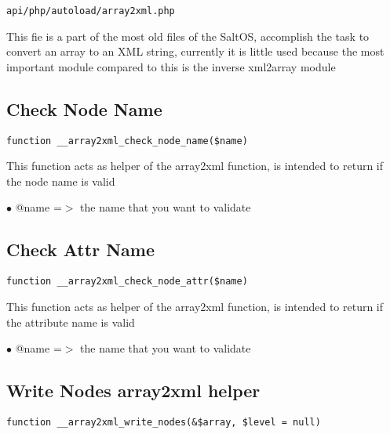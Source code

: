 \documentclass[a4paper]{book}
\begin{document}
\begin{lstlisting}
api/php/autoload/array2xml.php
\end{lstlisting}

This fie is a part of the most old files of the SaltOS, accomplish the task to convert an array
to an XML string, currently it is little used because the most important module compared to this
is the inverse xml2array module

\hypertarget{toc38}{}
\subsection{Check Node Name}

\begin{lstlisting}
function __array2xml_check_node_name($name)
\end{lstlisting}

This function acts as helper of the array2xml function, is intended to
return if the node name is valid

\begin{compactitem}
\item[\color{myblue}$\bullet$] @name =$>$ the name that you want to validate
\end{compactitem}

\hypertarget{toc39}{}
\subsection{Check Attr Name}

\begin{lstlisting}
function __array2xml_check_node_attr($name)
\end{lstlisting}

This function acts as helper of the array2xml function, is intended to
return if the attribute name is valid

\begin{compactitem}
\item[\color{myblue}$\bullet$] @name =$>$ the name that you want to validate
\end{compactitem}

\hypertarget{toc40}{}
\subsection{Write Nodes array2xml helper}

\begin{lstlisting}
function __array2xml_write_nodes(&$array, $level = null)
\end{lstlisting}
\end{document}
